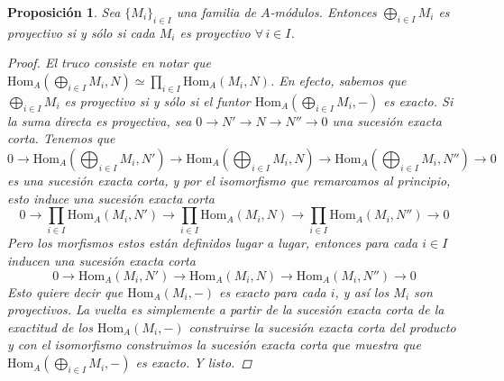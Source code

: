 \documentclass[12pt]{book}
\newtheorem{prop}[teo]{Proposición}
\theoremstyle{definition}
\renewcommand{\hom}{\mathrm{Hom}}
\begin{document}
\begin{prop}
Sea $\{M_i\}_{i\in I}$ una familia de $A$-módulos. Entonces $\displaystyle\bigoplus_{i\in I}M_i$ es proyectivo si y sólo si cada $M_i$ es proyectivo $\forall\, i\in I$.
\begin{proof}
El truco consiste en notar que $\hom_A\left(\displaystyle\bigoplus_{i\in I}M_i,N\right)\simeq \displaystyle\prod_{i\in I}\hom_A(M_i,N)$. En efecto, sabemos que $\displaystyle\bigoplus_{i\in I} M_i$ es proyectivo si y sólo si el funtor $\hom_A\left(\displaystyle\bigoplus_{i\in I}M_i,-\right)$ es exacto. Si la suma directa es proyectiva, sea $0\longrightarrow N'\longrightarrow N\longrightarrow N''\longrightarrow 0$ una sucesión exacta corta. Tenemos que $$0\longrightarrow\hom_A\left(\displaystyle\bigoplus_{i\in I}M_i,N'\right)\longrightarrow \hom_A\left(\bigoplus_{i\in I}M_i,N\right)\longrightarrow \hom_A\left(\bigoplus_{i\in I}M_i, N''\right)\longrightarrow 0$$ es una sucesión exacta corta, y por el isomorfismo que remarcamos al principio, esto induce una sucesión exacta corta $$0\longrightarrow\displaystyle\prod_{i\in I}\hom_A(M_i,N')\longrightarrow\prod_{i\in I}\hom_A(M_i,N)\longrightarrow\prod_{i\in I}\hom_A(M_i,N'')\longrightarrow 0$$ Pero los morfismos estos están definidos lugar a lugar, entonces para cada $i\in I$ inducen una sucesión exacta corta $$0\longrightarrow \hom_A(M_i,N')\longrightarrow \hom_A(M_i,N)\longrightarrow\hom_A(M_i,N'')\longrightarrow 0$$ Esto quiere decir que $\hom_A(M_i,-)$ es exacto para cada $i$, y así los $M_i$ son proyectivos. La vuelta es simplemente a partir de la sucesión exacta corta de la exactitud de los $\hom_A(M_i,-)$ construirse la sucesión exacta corta del producto y con el isomorfismo construimos la sucesión exacta corta que muestra que $\hom_A\left(\displaystyle\bigoplus_{i\in I}M_i,-\right)$ es exacto. Y listo.
\end{proof}
\end{prop}
\end{document}
